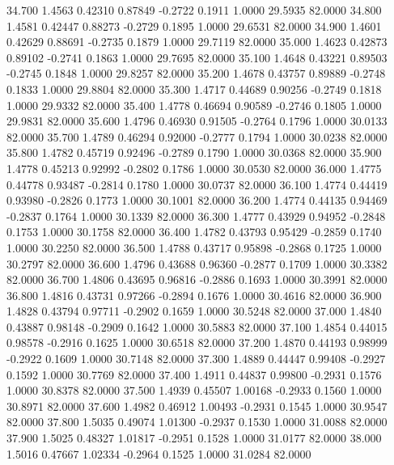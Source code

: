   34.700   1.4563   0.42310   0.87849  -0.2722   0.1911   1.0000  29.5935  82.0000
  34.800   1.4581   0.42447   0.88273  -0.2729   0.1895   1.0000  29.6531  82.0000
  34.900   1.4601   0.42629   0.88691  -0.2735   0.1879   1.0000  29.7119  82.0000
  35.000   1.4623   0.42873   0.89102  -0.2741   0.1863   1.0000  29.7695  82.0000
  35.100   1.4648   0.43221   0.89503  -0.2745   0.1848   1.0000  29.8257  82.0000
  35.200   1.4678   0.43757   0.89889  -0.2748   0.1833   1.0000  29.8804  82.0000
  35.300   1.4717   0.44689   0.90256  -0.2749   0.1818   1.0000  29.9332  82.0000
  35.400   1.4778   0.46694   0.90589  -0.2746   0.1805   1.0000  29.9831  82.0000
  35.600   1.4796   0.46930   0.91505  -0.2764   0.1796   1.0000  30.0133  82.0000
  35.700   1.4789   0.46294   0.92000  -0.2777   0.1794   1.0000  30.0238  82.0000
  35.800   1.4782   0.45719   0.92496  -0.2789   0.1790   1.0000  30.0368  82.0000
  35.900   1.4778   0.45213   0.92992  -0.2802   0.1786   1.0000  30.0530  82.0000
  36.000   1.4775   0.44778   0.93487  -0.2814   0.1780   1.0000  30.0737  82.0000
  36.100   1.4774   0.44419   0.93980  -0.2826   0.1773   1.0000  30.1001  82.0000
  36.200   1.4774   0.44135   0.94469  -0.2837   0.1764   1.0000  30.1339  82.0000
  36.300   1.4777   0.43929   0.94952  -0.2848   0.1753   1.0000  30.1758  82.0000
  36.400   1.4782   0.43793   0.95429  -0.2859   0.1740   1.0000  30.2250  82.0000
  36.500   1.4788   0.43717   0.95898  -0.2868   0.1725   1.0000  30.2797  82.0000
  36.600   1.4796   0.43688   0.96360  -0.2877   0.1709   1.0000  30.3382  82.0000
  36.700   1.4806   0.43695   0.96816  -0.2886   0.1693   1.0000  30.3991  82.0000
  36.800   1.4816   0.43731   0.97266  -0.2894   0.1676   1.0000  30.4616  82.0000
  36.900   1.4828   0.43794   0.97711  -0.2902   0.1659   1.0000  30.5248  82.0000
  37.000   1.4840   0.43887   0.98148  -0.2909   0.1642   1.0000  30.5883  82.0000
  37.100   1.4854   0.44015   0.98578  -0.2916   0.1625   1.0000  30.6518  82.0000
  37.200   1.4870   0.44193   0.98999  -0.2922   0.1609   1.0000  30.7148  82.0000
  37.300   1.4889   0.44447   0.99408  -0.2927   0.1592   1.0000  30.7769  82.0000
  37.400   1.4911   0.44837   0.99800  -0.2931   0.1576   1.0000  30.8378  82.0000
  37.500   1.4939   0.45507   1.00168  -0.2933   0.1560   1.0000  30.8971  82.0000
  37.600   1.4982   0.46912   1.00493  -0.2931   0.1545   1.0000  30.9547  82.0000
  37.800   1.5035   0.49074   1.01300  -0.2937   0.1530   1.0000  31.0088  82.0000
  37.900   1.5025   0.48327   1.01817  -0.2951   0.1528   1.0000  31.0177  82.0000
  38.000   1.5016   0.47667   1.02334  -0.2964   0.1525   1.0000  31.0284  82.0000
